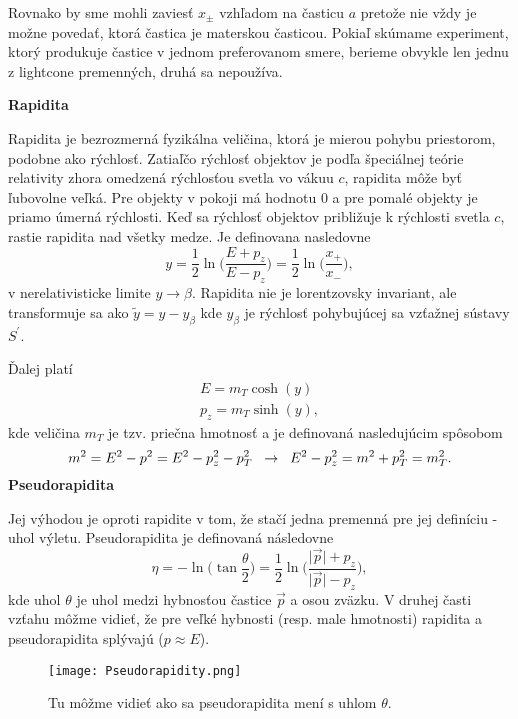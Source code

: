 \documentclass[../../main.tex]{subfiles}
\begin{document}
Rovnako by sme mohli zaviesť $x_{\pm}$ vzhľadom na časticu $a$ pretože nie vždy je možne povedať, ktorá častica je materskou časticou. Pokiaľ skúmame experiment, ktorý produkuje častice v jednom preferovanom smere, berieme obvykle len jednu z lightcone premenných, druhá sa nepoužíva.\newline

\textbf{Rapidita}\par
Rapidita je bezrozmerná fyzikálna veličina, ktorá je mierou pohybu priestorom, podobne ako rýchlosť. Zatiaľčo rýchlosť objektov je podľa špeciálnej teórie relativity zhora omedzená rýchlosťou svetla vo vákuu $c$, rapidita môže byť ľubovolne veľká. Pre objekty v pokoji má hodnotu 0 a pre pomalé objekty je priamo úmerná rýchlosti. Keď sa rýchlosť objektov približuje k rýchlosti svetla $c$, rastie rapidita nad všetky medze. Je definovana nasledovne $$ y=\frac{1}{2}\ln\bigg( \frac{E+p_z}{E-p_z} \bigg)=\frac{1}{2}\ln\bigg( \frac{x_+}{x_-} \bigg), $$
v nerelativisticke limite $y\rightarrow \beta$. Rapidita nie je lorentzovsky invariant, ale transformuje sa ako $\tilde{y}=y-y_{\beta}$ kde $y_{\beta}$ je rýchlosť pohybujúcej sa vzťažnej sústavy $S^{\prime}$.

Ďalej platí
\begin{equation}
\begin{gathered}
E=m_T\cosh(y) \\
p_z=m_T\sinh(y),
\end{gathered}
\end{equation}
kde veličina $m_T$ je tzv. priečna hmotnosť a je definovaná nasledujúcim spôsobom
$$ m^2=E^2-p^2=E^2-p_z^2-p_T^2 \hspace{0.2cm} \rightarrow \hspace{0.2cm} E^2-p^2_z=m^2+p^2_T=m^2_T. $$\newline
\newpage
\textbf{Pseudorapidita}\par
Jej výhodou je oproti rapidite v tom, že stačí jedna premenná pre jej definíciu - uhol výletu. Pseudorapidita je definovaná následovne
$$ \eta=-\ln\bigg( \tan\frac{\theta}{2}  \bigg) = \frac{1}{2}\ln \bigg( \frac{\lvert \vec{p} \rvert+p_z}{\lvert \vec{p} \rvert-p_z} \bigg), $$
kde uhol $\theta$ je uhol medzi hybnosťou častice $\vec{p}$ a osou zväzku. V druhej časti vzťahu môžme vidieť, že pre veľké hybnosti (resp. male hmotnosti) rapidita a pseudorapidita splývajú ($p\approx E$).
\begin{figure}[!h]
\centering
\texttt{[image: Pseudorapidity.png]}
\caption{Tu môžme vidieť ako sa pseudorapidita mení s uhlom $\theta$.}
\label{sf1:fig:Pseudorapidity}
\end{figure}
\newline
\end{document}
